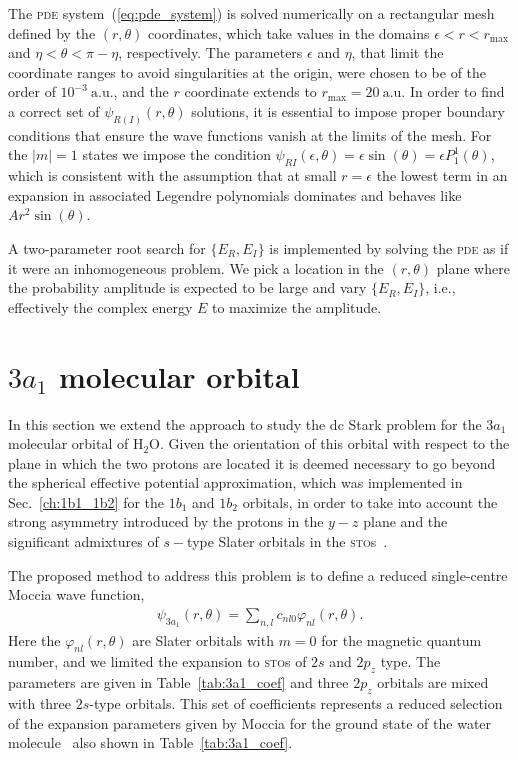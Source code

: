 The \textsc{pde} system~(\ref{eq:pde_system}) is solved numerically on
a rectangular mesh defined by the $(r, \theta)$ coordinates, which
take values in the domains $\epsilon < r < r_{\mathrm{max}}$ and $\eta
< \theta < \pi - \eta$, respectively. The parameters $\epsilon$ and
$\eta$, that limit the coordinate ranges to avoid singularities at the
origin, were chosen to be of the order of $10^{-3}\ \mathrm{a.u.}$,
and the $r$ coordinate extends to $r_{\mathrm{max}} =
20\ \mathrm{a.u.}$ In order to find a correct set of
$\psi_{R(I)}(r,\theta)$ solutions, it is essential to impose proper
boundary conditions that ensure the wave functions vanish at the
limits of the mesh. For the $|m| = 1$ states we impose the condition
$\psi_{R{I}}(\epsilon,\theta) = \epsilon \sin(\theta) = \epsilon
P_{1}^{1}(\theta)$, which is consistent with the assumption that at
small $r = \epsilon$ the lowest term in an expansion in associated
Legendre polynomials dominates and behaves like $A r^{2}
\sin(\theta)$.

A two-parameter root search for $\{E_{R}, E_{I}\}$ is implemented by
solving the \textsc{pde} as if it were an inhomogeneous problem. We
pick a location in the $(r,\theta)$ plane where the probability
amplitude is expected to be large and vary $\{E_{R}, E_{I}\}$, i.e.,
effectively the complex energy $E$ to maximize the amplitude.


\section{$3a_{1}$ molecular orbital}
\label{ch:3a1}

In this section we extend the approach to study the dc Stark problem
for the $3a_{1}$ molecular orbital of H$_{2}$O. Given the orientation
of this orbital with respect to the plane in which the two protons are
located it is deemed necessary to go beyond the spherical effective
potential approximation, which was implemented in
Sec.~\ref{ch:1b1_1b2} for the $1b_{1}$ and $1b_{2}$ orbitals, in order
to take into account the strong asymmetry introduced by the protons in
the $y-z$ plane and the significant admixtures of $s-$type Slater
orbitals in the \textsc{sto}s~\cite{Moccia_1964}.

The proposed method to address this problem is to define a reduced
single-centre Moccia wave function,
%
\begin{eqnarray}
\psi_{3a_{1}}(r,\theta) = \sum_{n,l} c_{nl0} \varphi_{nl}(r,\theta).
\label{eq:3a1Moccia_expansion}
\end{eqnarray}
%
Here the $\varphi_{nl}(r,\theta)$ are Slater orbitals with $m=0$ for
the magnetic quantum number, and we limited the expansion to
\textsc{sto}s of $2s$ and $2p_{z}$ type. The parameters are given in
Table~\ref{tab:3a1_coef} and three $2p_{z}$ orbitals are mixed with
three $2s$-type orbitals. This set of coefficients represents a
reduced selection of the expansion parameters given by Moccia for the
ground state of the water molecule~\cite{Moccia_1964} also shown in
Table~\ref{tab:3a1_coef}.

